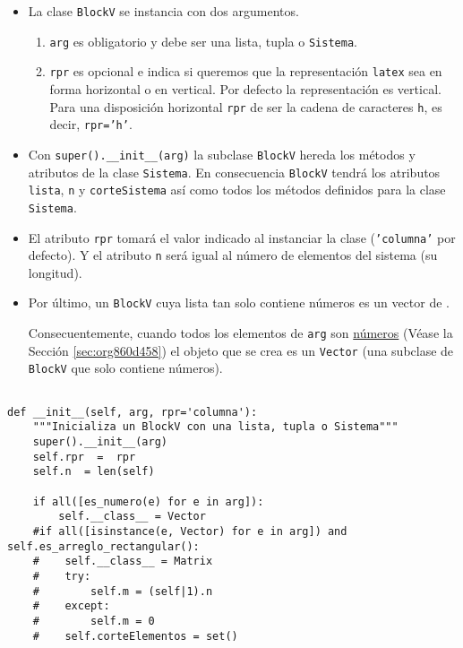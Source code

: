 \documentclass[11pt]{report}
\begin{document}
\begin{itemize}
\item La clase \texttt{BlockV} se instancia con dos argumentos. 

\begin{enumerate}
\item \texttt{arg} es obligatorio y debe ser una lista, tupla o \texttt{Sistema}.

\item \texttt{rpr} es opcional e indica si queremos que la representación
\texttt{latex} sea en forma horizontal o en vertical. Por defecto la
representación es vertical. Para una disposición horizontal \texttt{rpr}
de ser la cadena de caracteres \texttt{h}, es decir, \texttt{rpr='h'}.
\end{enumerate}

\item Con \texttt{super().\_\_init\_\_(arg)} la subclase \texttt{BlockV} hereda los métodos
y atributos de la clase \texttt{Sistema}. En consecuencia \texttt{BlockV} tendrá
los atributos \texttt{lista}, \texttt{n} y \texttt{corteSistema} así como todos los
métodos definidos para la clase \texttt{Sistema}.

\item El atributo \texttt{rpr} tomará el valor indicado al instanciar la clase
(\texttt{'columna'} por defecto). Y el atributo \texttt{n} será igual al número de
elementos del sistema (su longitud).

\item Por último, un \texttt{BlockV} cuya lista tan solo contiene números es un
vector de \R[n].

Consecuentemente, cuando todos los elementos de \texttt{arg} son \hyperref[sec:org860d458]{números}
(Véase la Sección \ref{sec:org860d458}) el objeto que se crea es un \texttt{Vector} (una
subclase de \texttt{BlockV} que solo contiene números).
\end{itemize}


\begin{verbatim}

def __init__(self, arg, rpr='columna'):
    """Inicializa un BlockV con una lista, tupla o Sistema"""
    super().__init__(arg)
    self.rpr  =  rpr
    self.n  = len(self)
    
    if all([es_numero(e) for e in arg]):
        self.__class__ = Vector
    #if all([isinstance(e, Vector) for e in arg]) and self.es_arreglo_rectangular():
    #    self.__class__ = Matrix
    #    try:
    #        self.m = (self|1).n
    #    except:
    #        self.m = 0
    #    self.corteElementos = set()
        
\end{verbatim}
\end{document}
